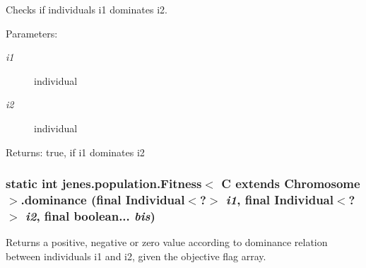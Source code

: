 Checks if individuals i1 dominates i2.

\begin{Desc}
\item[Parameters:]
\begin{description}
\item[{\em i1}]individual \item[{\em i2}]individual \end{description}
\end{Desc}
\begin{Desc}
\item[Returns:]true, if i1 dominates i2 \end{Desc}
\hypertarget{classjenes_1_1population_1_1_fitness_3_01_c_01extends_01_chromosome_01_4_40ee2060c7904075c6606c73f169e7b8}{
\subsubsection[dominance]{\setlength{\rightskip}{0pt plus 5cm}static int jenes.population.Fitness$<$ C extends Chromosome $>$.dominance (final Individual$<$?$>$ {\em i1}, \/  final Individual$<$?$>$ {\em i2}, \/  final boolean... {\em bis})}}
\label{classjenes_1_1population_1_1_fitness_3_01_c_01extends_01_chromosome_01_4_40ee2060c7904075c6606c73f169e7b8}


Returns a positive, negative or zero value according to dominance relation between individuals i1 and i2, given the objective flag array.

